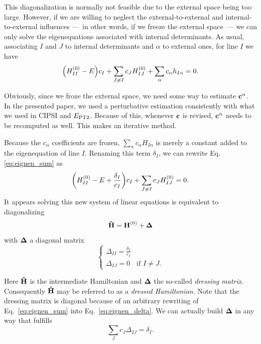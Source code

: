 \documentclass[./thesis.tex]{subfiles}
\begin{document}
This diagonalization is normally not feasible due to the external space being too large. However, if we are willing to neglect the external-to-external and internal-to-external influences ---~in other words, if we freeze the external space~--- we can only solve the eigenequations associated with internal determinants. As usual, associating $I$ and $J$ to internal determinants and $\alpha$ to external ones, for line $I$ we have
\begin{equation}
\qty({H}^{(0)}_{II} - E)c_I  + \sum_{J \neq I} {c_J {H}^{(0)}_{IJ}} + \sum_\alpha {c_\alpha {h}_{I \alpha}} = 0.
\label{eq:eignen_sum}
\end{equation}

Obviously, since we froze the external space, we need some way to estimate ${\bf c}^\alpha$. In the presented paper, we used a perturbative estimation consistently with what we used in CIPSI and $E_\text{PT2}$. Because of this, whenever $\bf c$ is revised, ${\bf c}^\alpha$ needs to be recomputed as well. This makes \Bk an iterative method.

Because the $c_\alpha$ coefficients are frozen, $\sum_\alpha {c_\alpha H_{I \alpha}}$ is merely a constant added to the eigenequation of line $I$. Renaming this term $\delta_I$, we can rewrite Eq.\eqref{eq:eignen_sum} as
\begin{equation}
\qty({H}^{(0)}_{II} - E + \frac{\delta_I}{c_I})c_I  + \sum_{J \neq I} {c_J {H}^{(0)}_{IJ}} = 0.
\label{eq:eignen_delta}
\end{equation}
It appears solving this new system of linear equations is equivalent to diagonalizing 
\begin{equation}
{\bf \tilde H} = {\bf H}^{(0)} + {\bf \Delta} 
\end{equation}
with ${\bf \Delta}$ a diagonal matrix
\begin{equation}
\begin{cases}
\Delta_{II}=\frac{\delta_I}{c_I}\\
\Delta_{IJ}=0 & \text{if } I \neq J.
\end{cases}
\end{equation}

Here ${\bf \tilde H}$ is the intermediate Hamiltonian and ${\bf \Delta}$ the so-called \emph{dressing matrix}. Consequently ${\bf \tilde H}$ may be referred to as a \emph{dressed Hamiltonian}. 
Note that the dressing matrix is diagonal because of an arbitrary rewriting of Eq.~\eqref{eq:eignen_sum} into Eq.~\eqref{eq:eignen_delta}. We can actually build ${\bf \Delta}$ in any way that fulfills
\begin{equation}
\sum_J c_J \Delta_{IJ}  = \delta_I.
\label{eq:arbitrary_dressing}
\end{equation}
\end{document}
